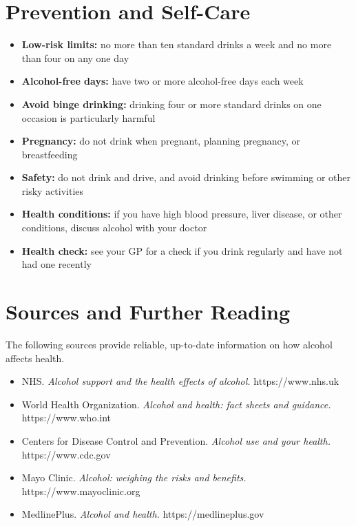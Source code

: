 \section*{Prevention and Self-Care}
\begin{itemize}
    \item \textbf{Low-risk limits:} no more than ten standard drinks a week and no more than four on any one day
    \item \textbf{Alcohol-free days:} have two or more alcohol-free days each week
    \item \textbf{Avoid binge drinking:} drinking four or more standard drinks on one occasion is particularly harmful
    \item \textbf{Pregnancy:} do not drink when pregnant, planning pregnancy, or breastfeeding
    \item \textbf{Safety:} do not drink and drive, and avoid drinking before swimming or other risky activities
    \item \textbf{Health conditions:} if you have high blood pressure, liver disease, or other conditions, discuss alcohol with your doctor
    \item \textbf{Health check:} see your GP for a check if you drink regularly and have not had one recently
\end{itemize}

\section*{Sources and Further Reading}
The following sources provide reliable, up-to-date information on how alcohol affects health.

\begin{itemize}
    \item NHS. \textit{Alcohol support and the health effects of alcohol.} https://www.nhs.uk
    \item World Health Organization. \textit{Alcohol and health: fact sheets and guidance.} https://www.who.int
    \item Centers for Disease Control and Prevention. \textit{Alcohol use and your health.} https://www.cdc.gov
    \item Mayo Clinic. \textit{Alcohol: weighing the risks and benefits.} https://www.mayoclinic.org
    \item MedlinePlus. \textit{Alcohol and health.} https://medlineplus.gov
\end{itemize}
